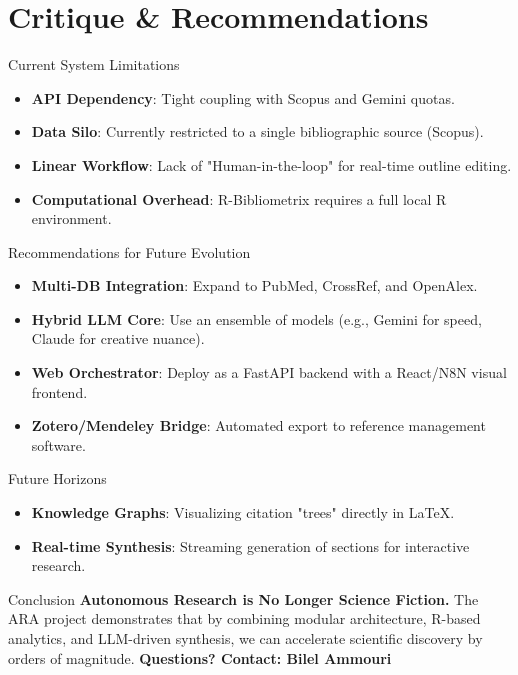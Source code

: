 \documentclass[10pt]{beamer}
\begin{document}
\section{Critique \& Recommendations}
\begin{frame}{Current System Limitations}
    \begin{itemize}
        \item \textbf{API Dependency}: Tight coupling with Scopus and Gemini quotas.
        \item \textbf{Data Silo}: Currently restricted to a single bibliographic source (Scopus).
        \item \textbf{Linear Workflow}: Lack of "Human-in-the-loop" for real-time outline editing.
        \item \textbf{Computational Overhead}: R-Bibliometrix requires a full local R environment.
    \end{itemize}
\end{frame}

\begin{frame}{Recommendations for Future Evolution}
    \begin{itemize}
        \item \textbf{Multi-DB Integration}: Expand to PubMed, CrossRef, and OpenAlex.
        \item \textbf{Hybrid LLM Core}: Use an ensemble of models (e.g., Gemini for speed, Claude for creative nuance).
        \item \textbf{Web Orchestrator}: Deploy as a FastAPI backend with a React/N8N visual frontend.
        \item \textbf{Zotero/Mendeley Bridge}: Automated export to reference management software.
    \end{itemize}
\end{frame}

\begin{frame}{Future Horizons}
    \begin{itemize}
        \item \textbf{Knowledge Graphs}: Visualizing citation "trees" directly in LaTeX.
        \item \textbf{Real-time Synthesis}: Streaming generation of sections for interactive research.
    \end{itemize}
\end{frame}

\begin{frame}{Conclusion}
    \centering
    \Large \textbf{Autonomous Research is No Longer Science Fiction.}
    \vfill
    \small 
    The ARA project demonstrates that by combining modular architecture, R-based analytics, and LLM-driven synthesis, we can accelerate scientific discovery by orders of magnitude.
    \vfill
    \textbf{Questions? Contact: Bilel Ammouri}
\end{frame}
\end{document}
